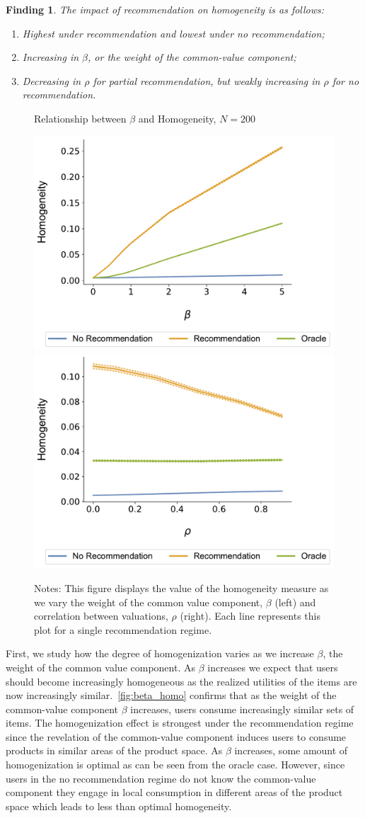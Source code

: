 \documentclass[manuscript]{acmart}
\newtheorem{finding}{Finding}
\begin{document}
\begin{finding}\label{finding_homogeneity}
The impact of recommendation on homogeneity is as follows:
\begin{enumerate}
\item Highest under recommendation and lowest under no recommendation;
\item Increasing in $\beta$, or the weight of the common-value component;
\item Decreasing in $\rho$ for partial recommendation, but weakly increasing in $\rho$ for no recommendation.
\end{enumerate}
\end{finding}

\begin{figure}[t]
\caption{Relationship between $\beta$ and Homogeneity, $N = 200$}
\includegraphics[width=.3\linewidth]{figures/beta_homogeneity_N_200_T_20}
\includegraphics[width=.3\linewidth]{figures/rho_homogeneity_N_200_T_20}\label{fig:beta_homo}
\caption*{\scriptsize Notes: This figure displays the value of the homogeneity measure as we vary the weight of the common value component, $\beta$ (left) and correlation between valuations, $\rho$ (right). Each line represents this plot for a single recommendation regime.}
\end{figure}

First, we study how the degree of homogenization varies as we increase $\beta$, the weight of the common value component. As $\beta$ increases we expect that users should become increasingly homogeneous as the realized utilities of the items are now increasingly similar.~\autoref{fig:beta_homo} confirms that as the weight of the common-value component $\beta$ increases, users consume increasingly similar sets of items. The homogenization effect is strongest under the recommendation regime since the revelation of the common-value component induces users to consume products in similar areas of the product space. As $\beta$ increases, some amount of homogenization is optimal as can be seen from the oracle case. However, since users in the no recommendation regime do not know the common-value component they engage in local consumption in different areas of the product space which leads to less than optimal homogeneity.
\par
\end{document}
